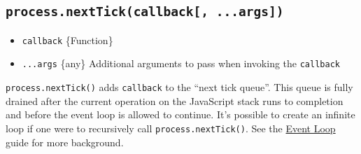 \begin{Shaded}
\begin{Highlighting}[]
 \OperatorTok{;}

\NormalTok{())}\OperatorTok{;}
\end{Highlighting}
\end{Shaded}

\begin{Shaded}
\begin{Highlighting}[]
\OperatorTok{=} \NormalTok{(}\NormalTok{)}\OperatorTok{;}

\NormalTok{())}\OperatorTok{;}
\end{Highlighting}
\end{Shaded}

\subsection{\texorpdfstring{\texttt{process.nextTick(callback{[},\ ...args{]})}}{process.nextTick(callback{[}, ...args{]})}}\label{process.nexttickcallback-...args}

\begin{itemize}
\tightlist
\item
  \texttt{callback} \{Function\}
\item
  \texttt{...args} \{any\} Additional arguments to pass when invoking
  the \texttt{callback}
\end{itemize}

\texttt{process.nextTick()} adds \texttt{callback} to the ``next tick
queue''. This queue is fully drained after the current operation on the
JavaScript stack runs to completion and before the event loop is allowed
to continue. It's possible to create an infinite loop if one were to
recursively call \texttt{process.nextTick()}. See the
\href{https://nodejs.org/en/docs/guides/event-loop-timers-and-nexttick/\#process-nexttick}{Event
Loop} guide for more background.

